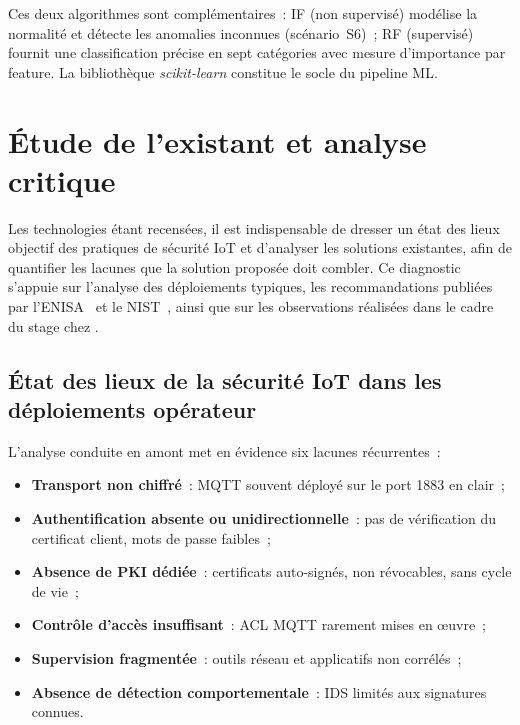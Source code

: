 Ces deux algorithmes sont complémentaires~: IF (non supervisé) modélise la normalité et détecte les anomalies inconnues (scénario~S6)~; RF (supervisé) fournit une classification précise en sept catégories avec mesure d'importance par feature. La bibliothèque \emph{scikit-learn} constitue le socle du pipeline ML.

\section{Étude de l'existant et analyse critique}
\label{sec:analyse-existant}
\label{sec:ea-analyse}

Les technologies étant recensées, il est indispensable de dresser un état des lieux objectif des pratiques de sécurité IoT et d'analyser les solutions existantes, afin de quantifier les lacunes que la solution proposée doit combler. Ce diagnostic s'appuie sur l'analyse des déploiements typiques, les recommandations publiées par l'ENISA~\cite{enisa_iot} et le NIST~\cite{nist_sp800213}, ainsi que sur les observations réalisées dans le cadre du stage chez \TT{}.

\subsection{État des lieux de la sécurité IoT dans les déploiements opérateur}

L'analyse conduite en amont met en évidence six lacunes récurrentes~:
\begin{itemize}[leftmargin=*]
	\item \textbf{Transport non chiffré}~: MQTT souvent déployé sur le port 1883 en clair~;
	\item \textbf{Authentification absente ou unidirectionnelle}~: pas de vérification du certificat client, mots de passe faibles~;
	\item \textbf{Absence de PKI dédiée}~: certificats auto-signés, non révocables, sans cycle de vie~;
	\item \textbf{Contrôle d'accès insuffisant}~: ACL MQTT rarement mises en \oe{}uvre~;
	\item \textbf{Supervision fragmentée}~: outils réseau et applicatifs non corrélés~;
	\item \textbf{Absence de détection comportementale}~: IDS limités aux signatures connues.
\end{itemize}

